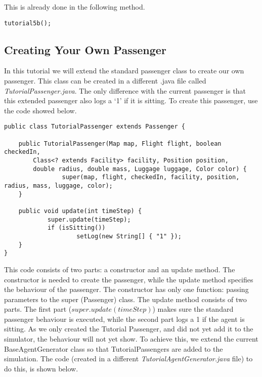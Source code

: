 \documentclass{article}
\begin{document}
This is already done in the following method.

\begin{verbatim}
tutorial5b();
\end{verbatim}

\subsection{Creating Your Own Passenger} \label{sec:creating}
In this tutorial we will extend the standard passenger class to create our own passenger. This class can be created in a different .java file called \textit{TutorialPassenger.java}. The only difference with the current passenger is that this extended passenger also logs a `1' if it is sitting. To create this passenger, use the code showed below.

\begin{verbatim}
public class TutorialPassenger extends Passenger {

    public TutorialPassenger(Map map, Flight flight, boolean checkedIn,     
        Class<? extends Facility> facility,	Position position, 
        double radius, double mass, Luggage luggage, Color color) {
		        super(map, flight, checkedIn, facility, position, radius, mass, luggage, color);
	}
    
    public void update(int timeStep) {
        	super.update(timeStep);
    	    if (isSitting())
    	    	    setLog(new String[] { "1" });
    }
}
\end{verbatim}

This code consists of two parts: a constructor and an update method. The constructor is needed to create the passenger, while the update method specifies the behaviour of the passenger. The constructor has only one function: passing parameters to the super (Passenger) class. The update method consists of two parts. The first part ($super.update(timeStep)$) makes sure the standard passenger behaviour is executed, while the second part logs a 1 if the agent is sitting. As we only created the Tutorial Passenger, and did not yet add it to the simulator, the behaviour will not yet show. To achieve this, we extend the current BaseAgentGenerator class so that TutorialPassengers are added to the simulation. The code (created in a different \textit{TutorialAgentGenerator.java} file) to do this, is shown below.
\end{document}
